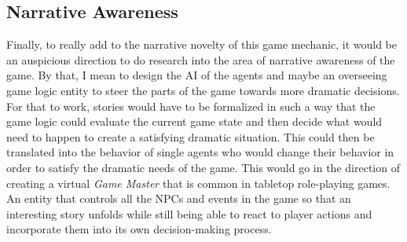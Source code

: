 \subsection{Narrative Awareness}
Finally, to really add to the narrative novelty of this game mechanic, it would be an auspicious direction to do research into the area of narrative awareness of the game. By that, I mean to design the AI of the agents and maybe an overseeing game logic entity to steer the parts of the game towards more dramatic decisions. For that to work, stories would have to be formalized in such a way that the game logic could evaluate the current game state and then decide what would need to happen to create a satisfying dramatic situation. This could then be translated into the behavior of single agents who would change their behavior in order to satisfy the dramatic needs of the game. This would go in the direction of creating a virtual \textit{Game Master} that is common in tabletop role-playing games. An entity that controls all the NPCs and events in the game so that an interesting story unfolds while still being able to react to player actions and incorporate them into its own decision-making process.